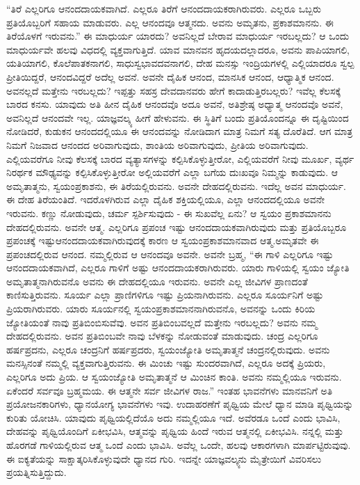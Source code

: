 “ತಿರೆ ಎಲ್ಲರಿಗೂ ಆನಂದದಾಯಕವಾಗಿದೆ. ಎಲ್ಲರೂ ತಿರೆಗೆ ಆನಂದದಾಯಕರಾಗಿರುವರು. ಎಲ್ಲರೂ ಒಬ್ಬರು ಪ್ರತಿಯೊಬ್ಬರಿಗೆ ಸಹಾಯ ಮಾಡುವರು. ಎಲ್ಲ ಆನಂದವೂ ಆತ್ಮನದು. ಅವನು ಅಮೃತನು, ಪ್ರಕಾಶಮಾನನು. ಈ ತಿರೆಯೊಳಗೆ ಇರುವನು.” ಈ ಮಾಧುರ್ಯ ಯಾರದು? ಅವನಿಲ್ಲದೆ ಬೇರಾವ ಮಾಧುರ್ಯ ಇರಬಲ್ಲದು? ಆ ಒಂದು ಮಾಧುರ್ಯವೇ ಹಲವು ವಿಧದಲ್ಲಿ ವ್ಯಕ್ತವಾಗುತ್ತಿದೆ. ಯಾವ ಮಾನವನ ಹೃದಯದಲ್ಲಾದರೂ, ಅವನು ಪಾಪಿಯಾಗಲಿ, ಯತಿಯಾಗಲಿ, ಕೊಲೆಪಾತಕನಾಗಲಿ, ಸಾಧುಸ್ವಭಾವದವನಾಗಲಿ, ದೇಹ ಮನಸ್ಸು ಇಂದ್ರಿಯಗಳಲ್ಲಿ ಎಲ್ಲಿಯಾದರೂ ಸ್ವಲ್ಪ ಪ್ರೀತಿಯಿದ್ದರೆ, ಆನಂದವಿದ್ದರೆ ಅದೆಲ್ಲ ಅವನೆ. ಅವನೇ ದೈಹಿಕ ಆನಂದ, ಮಾನಸಿಕ ಆನಂದ, ಆಧ್ಯಾತ್ಮಿಕ ಆನಂದ. ಅವನಲ್ಲದೆ ಮತ್ತೇನು ಇರಬಲ್ಲದು? ಇಪ್ಪತ್ತು ಸಹಸ್ರ ದೇವದಾನವರು ಹೇಗೆ ಕಾದಾಡುತ್ತಿರಬಲ್ಲರು? ಇವೆಲ್ಲ ಕೆಲಸಕ್ಕೆ ಬಾರದ ಕನಸು. ಯಾವುದು ಅತಿ ಹೀನ ದೈಹಿಕ ಆನಂದವೊ ಅದೂ ಅವನೆ, ಅತಿಶ್ರೇಷ್ಠ ಅಧ್ಯಾತ್ಮ ಆನಂದವೊ ಅವನೆ, ಅವನಿಲ್ಲದೆ ಆನಂದವೇ ಇಲ್ಲ. ಯಾಜ್ಞವಲ್ಕ್ಯ ಹೀಗೆ ಹೇಳುವನು. ಈ ಸ್ಥಿತಿಗೆ ಬಂದು ಪ್ರತಿಯೊಂದನ್ನೂ ಈ ದೃಷ್ಟಿಯಿಂದ ನೋಡಿದರೆ, ಕುಡುಕನ ಆನಂದದಲ್ಲಿಯೂ ಈ ಆನಂದವನ್ನು ನೋಡಿದಾಗ ಮಾತ್ರ ನಿಮಗೆ ಸತ್ಯ ದೊರೆತಿದೆ. ಆಗ ಮಾತ್ರ ನಿಮಗೆ ನಿಜವಾದ ಆನಂದದ ಅರಿವಾಗುವುದು, ಶಾಂತಿಯ ಅರಿವಾಗುವುದು, ಪ್ರೀತಿಯ ಅರಿವಾಗುವುದು. ಎಲ್ಲಿಯವರೆಗೂ ನೀವು ಕೆಲಸಕ್ಕೆ ಬಾರದ ವ್ಯತ್ಯಾಸಗಳನ್ನು ಕಲ್ಪಿಸಿಕೊಳ್ಳುತ್ತೀರೋ, ಎಲ್ಲಿಯವರೆಗೆ ನೀವು ಮೂರ್ಖ, ವ್ಯರ್ಥ ನಿರರ್ಥಕ ಮೌಢ್ಯವನ್ನು ಕಲ್ಪಿಸಿಕೊಳ್ಳುತ್ತೀರೋ ಅಲ್ಲಿಯವರೆಗೆ ಎಲ್ಲಾ ಬಗೆಯ ದುಃಖವೂ ನಿಮ್ಮನ್ನು ಕಾಡುವುದು. ಆ ಅಮೃತಾತ್ಮನು, ಸ್ವಯಂಪ್ರಕಾಶನು, ಈ ತಿರೆಯಲ್ಲಿರುವನು. ಅವನೇ ದೇಹದಲ್ಲಿರುವನು. ಇದೆಲ್ಲ ಅವನ ಮಾಧುರ್ಯ. ಈ ದೇಹ ತಿರೆಯಂತಿದೆ. ಇದರೊಳಗಿರುವ ಎಲ್ಲಾ ದೈಹಿಕ ಶಕ್ತಿಯಲ್ಲಿಯೂ, ಎಲ್ಲಾ ಆನಂದದಲ್ಲಿಯೂ ಅವನೇ ಇರುವನು. ಕಣ್ಣು ನೋಡುವುದು, ಚರ್ಮ ಸ್ಪರ್ಶಿಸುವುದು - ಈ ಸುಖವೆಲ್ಲ ಏನು? ಆ ಸ್ವಯಂ ಪ್ರಕಾಶಮಾನನು ದೇಹದಲ್ಲಿರುವನು. ಅವನೇ ಆತ್ಮ. ಎಲ್ಲರಿಗೂ ಪ್ರಪಂಚ ಇಷ್ಟು ಆನಂದದಾಯಕವಾಗಿರುವುದು ಮತ್ತು ಪ್ರತಿಯೊಬ್ಬರೂ ಪ್ರಪಂಚಕ್ಕೆ ಇಷ್ಟು\break ಆನಂದದಾಯಕವಾಗಿರುವುದಕ್ಕೆ ಕಾರಣ ಆ ಸ್ವಯಂಪ್ರಕಾಶಮಾನವಾದ ಆತ್ಮ.\break ಅಮೃತವೇ ಈ ಪ್ರಪಂಚದಲ್ಲಿರುವ ಆನಂದ. ನಮ್ಮಲ್ಲಿರುವ ಆ ಆನಂದವೂ ಅವನೇ. ಅವನೇ ಬ್ರಹ್ಮ, “ಈ ಗಾಳಿ ಎಲ್ಲರಿಗೂ ಇಷ್ಟು ಆನಂದದಾಯಕವಾಗಿದೆ, ಎಲ್ಲರೂ ಗಾಳಿಗೆ ಅಷ್ಟು ಆನಂದದಾಯಕರಾಗಿರುವರು. ಯಾರು ಗಾಳಿಯಲ್ಲಿ ಸ್ವಯಂ ಜ್ಯೋತಿ ಅಮೃತಾತ್ಮನಾಗಿರುವನೊ ಅವನು ಈ ದೇಹದಲ್ಲಿಯೂ ಇರುವನು. ಅವನೇ ಎಲ್ಲ ಜೀವಿಗಳ ಪ್ರಾಣದಂತೆ ಕಾಣಿಸುತ್ತಿರುವನು. ಸೂರ್ಯ ಎಲ್ಲಾ ಪ್ರಾಣಿಗಳಿಗೂ ಇಷ್ಟು ಪ್ರಿಯನಾಗಿರುವನು. ಎಲ್ಲರೂ ಸೂರ್ಯನಿಗೆ ಅಷ್ಟು ಪ್ರಿಯರಾಗಿರುವರು. ಯಾರು ಸೂರ್ಯನಲ್ಲಿ ಸ್ವಯಂಪ್ರಕಾಶಮಾನನಾಗಿರುವನೊ, ಅವನನ್ನು ಒಂದು ಕಿರಿಯ ಜ್ಯೋತಿಯಂತೆ ನಾವು ಪ್ರತಿಬಿಂಬಿಸುವೆವು. ಅವನ ಪ್ರತಿಬಿಂಬವಲ್ಲದೆ ಮತ್ತೇನು ಇರಬಲ್ಲದು? ಅವನು ನಮ್ಮ ದೇಹದಲ್ಲಿರುವನು. ಅವನ ಪ್ರತಿಬಿಂಬವೇ ನಾವು ಬೆಳಕನ್ನು ನೋಡುವಂತೆ ಮಾಡುವುದು. ಚಂದ್ರ ಎಲ್ಲರಿಗೂ ಹರ್ಷಪ್ರದನು, ಎಲ್ಲರೂ ಚಂದ್ರನಿಗೆ ಹರ್ಷಪ್ರದರು, ಸ್ವಯಂಜ್ಯೋತಿ ಅಮೃತಾತ್ಮನೆ ಚಂದ್ರನಲ್ಲಿರುವುದು. ಅವನು ಮನಸ್ಸಿನಂತೆ ನಮ್ಮಲ್ಲಿ ವ್ಯಕ್ತವಾಗುತ್ತಿರುವನು. ಈ ಮಿಂಚು ಇಷ್ಟು ಸುಂದರವಾಗಿದೆ, ಎಲ್ಲರೂ ಅದಕ್ಕೆ ಪ್ರಿಯರು, ಎಲ್ಲರಿಗೂ ಅದು ಪ್ರಿಯ. ಆ ಸ್ವಯಂಜ್ಯೋತಿ ಅಮೃತಾತ್ಮನೆ ಆ ಮಿಂಚಿನ ಕಾಂತಿ. ಅವನು ನಮ್ಮಲ್ಲಿಯೂ ಇರುವನು. ಏಕೆಂದರೆ ಸರ್ವವೂ ಬ್ರಹ್ಮಮಯ. ಈ ಆತ್ಮನೇ ಸರ್ವ ಜೀವಿಗಳ ರಾಜ.” ಇಂತಹ ಭಾವನೆಗಳು ಮಾನವನಿಗೆ ಅತಿ ಪ್ರಯೋಜನಕಾರಿಗಳು, ಧ್ಯಾನಯೋಗ್ಯ ಭಾವನೆಗಳು ಇವು. ಉದಾಹರಣೆಗೆ ಪೃಥ್ವಿಯ ಮೇಲೆ ಧ್ಯಾನ ಮಾಡಿ ಪೃಥ್ವಿಯನ್ನು ಕುರಿತು ಯೋಚಿಸಿ. ಯಾವುದು ಪೃಥ್ವಿಯಲ್ಲಿದೆಯೊ ಅದು ನಮ್ಮಲ್ಲಿಯೂ ಇದೆ. ಅವೆರಡೂ ಒಂದೆ ಎಂದು ಭಾವಿಸಿ, ದೇಹವನ್ನು ಪೃಥ್ವಿಯೊಂದಿಗೆ ಏಕೀಭವಿಸಿ, ಆತ್ಮವನ್ನು ಪೃಥ್ವಿಯ ಹಿಂದೆ ಇರುವ ಆತ್ಮನಲ್ಲಿ ಏಕೀಭವಿಸಿ. ನನ್ನಲ್ಲಿ ಮತ್ತು ಹೊರಗಡೆ ಗಾಳಿಯಲ್ಲಿರುವ ಆತ್ಮ ಒಂದೆ ಎಂದು ಭಾವಿಸಿ. ಅವೆಲ್ಲ ಒಂದೇ, ಹಲವು ಆಕಾರಗಳಾಗಿ ಮಾರ್ಪಟ್ಟಿರುವುವು. ಈ ಐಕ್ಯತೆಯನ್ನು ಸಾಕ್ಷಾತ್ಕರಿಸಿಕೊಳ್ಳುವುದೇ ಧ್ಯಾನದ ಗುರಿ. ಇದನ್ನೇ ಯಾಜ್ಞವಲ್ಕ್ಯನು ಮೈತ್ರೇಯಿಗೆ ವಿವರಿಸಲು ಪ್ರಯತ್ನಿಸುತ್ತಿದ್ದುದು.

